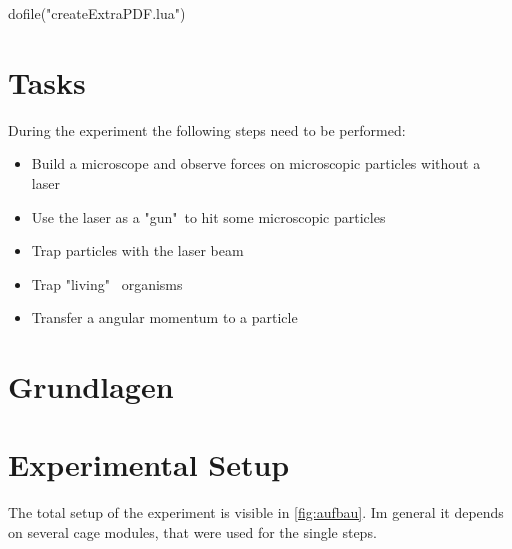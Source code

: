 \documentclass[12pt,english,ngerman]{scrartcl}
\begin{document}
\begin{luacode*}
dofile("createExtraPDF.lua")
\end{luacode*}


\tableofcontents

\newpage

\section{Tasks}\label{Auf}

During the experiment the following steps need to be performed:

\begin{itemize}
	\item Build a microscope and observe forces on microscopic particles without a laser
	\item Use the laser as a "gun"\  to hit some microscopic particles
	\item Trap particles with the laser beam
	\item Trap "living" \ organisms
	\item Transfer a angular momentum to a particle
\end{itemize}

\section{Grundlagen}\label{Grund}


\section{Experimental Setup}\label{sec:versuchsanordnung}

The total setup of the experiment is visible in \autoref{fig:aufbau}. Im general it depends on several cage modules, 
that were used for the single steps.
\end{document}

